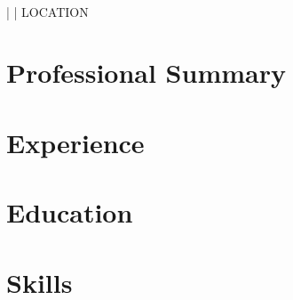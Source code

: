 \documentclass[11pt,a4paper]{article}
\begin{document}
\begin{center}
{\Huge \textbf{}}\\
 |  | {{LOCATION}}
\end{center}

\section*{Professional Summary}


\section*{Experience}


\section*{Education}


\section*{Skills}
\end{document}
